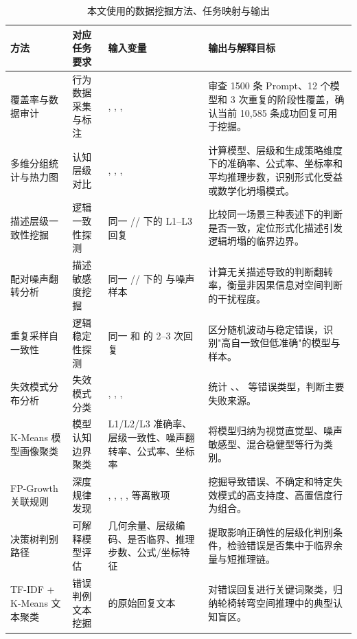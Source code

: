 \begin{table}[t]
\centering
\caption{本文使用的数据挖掘方法、任务映射与输出}
\label{tab:mining-methods}
\scriptsize
\begin{tabularx}{0.98\textwidth}{p{}p{}p{}Y}
\toprule
方法 & 对应任务要求 & 输入变量 & 输出与解释目标 \\
\midrule
覆盖率与数据审计 & 行为数据采集与标注 & , , ,  & 审查 1500 条 Prompt、12 个模型和 3 次重复的阶段性覆盖，确认当前 10{,}585 条成功回复可用于挖掘。\\
多维分组统计与热力图 & 认知层级对比 & , , ,  & 计算模型、层级和生成策略维度下的准确率、公式率、坐标率和平均推理步数，识别形式化受益或数学化坍塌模式。\\
描述层级一致性挖掘 & 逻辑一致性探测 & 同一 // 下的 L1--L3 回复 & 比较同一场景三种表述下的判断是否一致，定位形式化描述引发逻辑坍塌的临界边界。\\
配对噪声翻转分析 & 描述敏感度挖掘 & 同一 // 下的  与噪声样本 & 计算无关描述导致的判断翻转率，衡量非因果信息对空间判断的干扰程度。\\
重复采样自一致性 & 逻辑稳定性探测 & 同一  和  的 2--3 次回复 & 区分随机波动与稳定错误，识别"高自一致但低准确"的模型与样本。\\
失效模式分布分析 & 失效模式分类 & , , ,  & 统计 、、 等错误类型，判断主要失败来源。\\
K-Means 模型画像聚类 & 模型认知边界聚类 & L1/L2/L3 准确率、层级一致性、噪声翻转率、公式率、坐标率 & 将模型归纳为视觉直觉型、噪声敏感型、混合稳健型等行为类别。\\
FP-Growth 关联规则 & 深度规律发现 & , , , ,  等离散项 & 挖掘导致错误、不确定和特定失效模式的高支持度、高置信度行为组合。\\
决策树判别路径 & 可解释模型评估 & 几何余量、层级编码、是否临界、推理步数、公式/坐标特征 & 提取影响正确性的层级化判别条件，检验错误是否集中于临界余量与短推理链。\\
TF-IDF + K-Means 文本聚类 & 错误判例文本挖掘 &  的原始回复文本 & 对错误回复进行关键词聚类，归纳轮椅转弯空间推理中的典型认知盲区。\\
\bottomrule
\end{tabularx}
\end{table}

